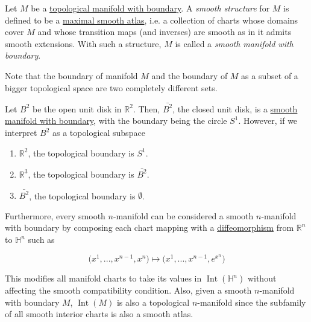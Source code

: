 \documentclass{article}
\DeclareMathOperator{\Int}{Int}
\newcounter{definition}[section]
\newcounter{example}[section]
\begin{document}
    \begin{definition}
      \label{def:smooth-manifold-with-boundary}
      Let $M$ be a \hyperref[def:topological-manifold-with-boundary]{topological manifold with boundary}. A \textit{smooth structure} for $M$ is defined to be a \hyperref[def:maximal-smooth-atlas]{maximal smooth atlas}, i.e. a collection of charts whose domains cover $M$ and whose transition maps (and inverses) are smooth as in it admits smooth extensions. With such a structure, $M$ is called a \textit{smooth manifold with boundary}. 
    \end{definition}

    Note that the boundary of manifold $M$ and the boundary of $M$ as a subset of a bigger topological space are two completely different sets. 

    \begin{example}
      \label{ex:the-closed-unit-disk-as-a-manifold-with-boundary}
      Let $B^2$ be the open unit disk in $\mathbb{R}^2$. Then, $\bar{B^2}$, the closed unit disk, is a \hyperref[def:smooth-manifold-with-boundary]{smooth manifold with boundary}, with the boundary being the circle $S^1$. However, if we interpret $B^2$ as a topological subspace 
      \begin{enumerate}
        \item $\mathbb{R}^2$, the topological boundary is $S^1$. 
        \item $\mathbb{R}^3$, the topological boundary is $\bar{B^2}$. 
        \item $\bar{B^2}$, the topological boundary is $\emptyset$. 
      \end{enumerate}
    \end{example}

    Furthermore, every smooth $n$-manifold can be considered a smooth $n$-manifold with boundary by composing each chart mapping with a \hyperref[def:diffeomorphism]{diffeomorphism} from $\mathbb{R}^n$ to $\mathbb{H}^n$ such as

      \begin{equation}
        \big(x^1, ..., x^{n-1}, x^n \big) \mapsto \big( x^1, ..., x^{n-1}, e^{x^n} \big)
      \end{equation}

    This modifies all manifold charts to take its values in $\Int(\mathbb{H}^n)$ without affecting the smooth compatibility condition. 
    Also, given a smooth $n$-manifold with boundary $M$, $\Int(M)$ is also a topological $n$-manifold since the subfamily of all smooth interior charts is also a smooth atlas. 
\end{document}
